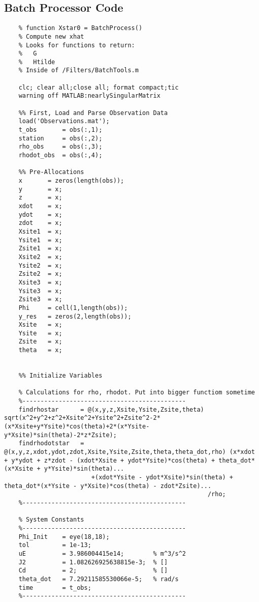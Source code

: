 \documentclass[12pt,a4paper,oneside]{article}
\numberwithin{equation}{section}   		%
\begin{document}
\newpage



%


\newpage


\begin{appendices}
\chapter{Batch Processor Code}
\label{app:Batch}
\begin{lstlisting}
	% function Xstar0 = BatchProcess()
	% Compute new xhat
	% Looks for functions to return:
	%   G
	%   Htilde
	% Inside of /Filters/BatchTools.m
	
	clc; clear all;close all; format compact;tic
	warning off MATLAB:nearlySingularMatrix
	
	%% First, Load and Parse Observation Data
	load('Observations.mat');
	t_obs       = obs(:,1);
	station     = obs(:,2);
	rho_obs     = obs(:,3);
	rhodot_obs  = obs(:,4);
	
	%% Pre-Allocations
	x       = zeros(length(obs));
	y       = x;
	z       = x;
	xdot    = x;
	ydot    = x;
	zdot    = x;
	Xsite1  = x;
	Ysite1  = x;
	Zsite1  = x;
	Xsite2  = x;
	Ysite2  = x;
	Zsite2  = x;
	Xsite3  = x;
	Ysite3  = x;
	Zsite3  = x;
	Phi     = cell(1,length(obs));
	y_res   = zeros(2,length(obs));
	Xsite   = x;
	Ysite   = x;
	Zsite   = x;
	theta   = x;
	
	
	%% Initialize Variables
	
	% Calculations for rho, rhodot. Put into bigger functiom sometime
	%---------------------------------------------
	findrhostar      = @(x,y,z,Xsite,Ysite,Zsite,theta) sqrt(x^2+y^2+z^2+Xsite^2+Ysite^2+Zsite^2-2*(x*Xsite+y*Ysite)*cos(theta)+2*(x*Ysite-y*Xsite)*sin(theta)-2*z*Zsite);
	findrhodotstar   = @(x,y,z,xdot,ydot,zdot,Xsite,Ysite,Zsite,theta,theta_dot,rho) (x*xdot + y*ydot + z*zdot - (xdot*Xsite + ydot*Ysite)*cos(theta) + theta_dot*(x*Xsite + y*Ysite)*sin(theta)...
	                    +(xdot*Ysite - ydot*Xsite)*sin(theta) + theta_dot*(x*Ysite - y*Xsite)*cos(theta) - zdot*Zsite)...
	                                                    /rho;
	%---------------------------------------------
	
	% System Constants
	%---------------------------------------------
	Phi_Init    = eye(18,18);
	tol         = 1e-13;
	uE          = 3.986004415e14;        % m^3/s^2
	J2          = 1.082626925638815e-3;  % []
	Cd          = 2;                     % []
	theta_dot   = 7.29211585530066e-5;   % rad/s
	time        = t_obs;
	%---------------------------------------------
	

\end{lstlisting}
\end{appendices}
\end{document}
